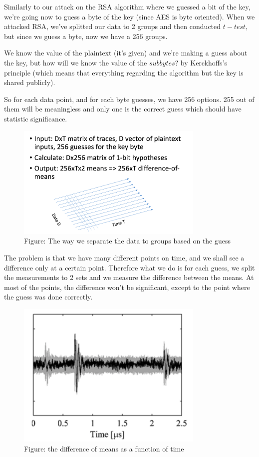 Similarly to our attack on the RSA algorithm where we guessed a bit of the key, we're going now to guess a byte of the key (since AES is byte oriented). When we attacked RSA, we've splitted our data to 2 groups and then conducted $t-test$, but since we guess a byte, now we have a 256 groups. 

We know the value of the plaintext (it's given) and we're making a guess about the key, but how will we know the value of the $subbytes$? by Kerckhoffs's principle (which means that everything regarding the algorithm but the key is shared publicly).

So for each data point, and for each byte guesses, we have 256 options. 255 out of them will be meaningless and only one is the correct guess which should have statistic significance.

\begin{figure}[H]
\centering
\includegraphics[width=0.8\textwidth]{images/Lecture6/dpa-separation-figure.png}
\caption{Figure: The way we separate the data to groups based on the guess}
\label{fig:DPA_Illustration}
\end{figure}

The problem is that we have many different points on time, and we shall see a difference only at a certain point. Therefore what we do is for each guess, we split the measurements to 2 sets and we measure the difference between the means. At most of the points, the difference won't be significant, except to the point where the guess was done correctly.

\begin{figure}[H]
\centering
\includegraphics[width=0.8\textwidth]{images/Lecture6/meansDiffFigure.png}
\caption{Figure: the difference of means as a function of time}
\label{fig:DPA_Illustration}
\end{figure}

